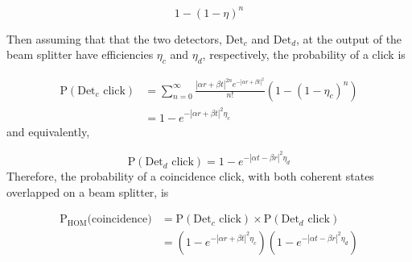 \begin{equation}
	1 - (1 - \eta)^n
\end{equation}

Then assuming that that the two detectors, $\text{Det}_c$ and $\text{Det}_d$, at the output of the beam splitter have efficiencies $\eta_c$ and $\eta_d$, respectively, the probability of a click is

\begin{align}
	\text{P}(\text{Det}_c \text{ click}) &= \sum_{n=0}^\infty \frac{|\alpha r + \beta t|^{2n} e^{-|\alpha r + \beta t|^2}}{n!}(1-(1-\eta_c)^n)\\
	&= 1 - e^{-|\alpha r + \beta t|^2 \eta_c}
\end{align}
and equivalently,

\begin{equation}
	\text{P}(\text{Det}_d \text{ click}) = 1 - e^{-|\alpha t - \beta r|^2 \eta_d}
\end{equation}
Therefore, the probability of a coincidence click, with both coherent states overlapped on a beam splitter, is

\begin{align}
	\text{P}_\text{HOM}\text{(coincidence)} &= \text{P}(\text{Det}_c \text{ click}) \times \text{P}(\text{Det}_d \text{ click})\\
	&= \left(1 - e^{-|\alpha r + \beta t|^2 \eta_c}\right)\left(1 - e^{-|\alpha t - \beta r|^2 \eta_d}\right)
\end{align}


